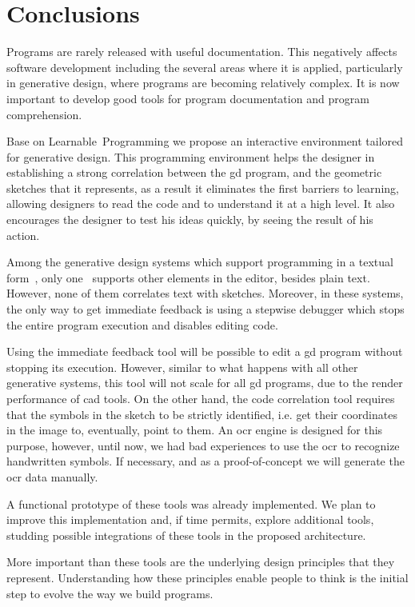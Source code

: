 
% 
% 

\section{Conclusions}
\label{sec:fin}

Programs are rarely released with useful documentation. This negatively affects software development including the several areas where it is applied, particularly in generative design, where programs are becoming relatively complex. It is now important to develop good tools for program documentation and program comprehension.

Base on Learnable~Programming we propose an interactive environment tailored for generative design. This programming environment helps the designer in establishing a strong correlation between the \ac{gd} program, and the geometric sketches that it represents, as a result it eliminates the first barriers to learning, allowing designers to read the code and to understand it at a high level. It also encourages the designer to test his ideas quickly, by seeing the result of his action.

Among the generative design systems which support programming in a textual form~\cite{aish2012designscript,lopes2011portable}, only one~\cite{lopes2011portable} supports other elements in the editor, besides plain text. However, none of them correlates text with sketches. Moreover, in these systems, the only way to get immediate feedback is using a stepwise debugger which stops the entire program execution and disables editing code.

Using the immediate feedback tool will be possible to edit a \ac{gd} program without stopping its execution. However, similar to what happens with all other generative systems, this tool will not scale for all \ac{gd} programs, due to the render performance of \ac{cad} tools. On the other hand, the code correlation tool requires that the symbols in the sketch to be strictly identified, i.e. get their coordinates in the image to, eventually, point to them. An \ac{ocr} engine is designed for this purpose, however, until now, we had bad experiences to use the \ac{ocr} to recognize handwritten symbols. If necessary, and as a proof-of-concept we will generate the \ac{ocr} data manually.

A functional prototype of these tools was already implemented. We plan to improve this implementation and, if time permits, explore additional tools, studding possible integrations of these tools in the proposed architecture.

More important than these tools are the underlying design principles that they represent. Understanding how these principles enable people to think is the initial step to evolve the way we build programs.